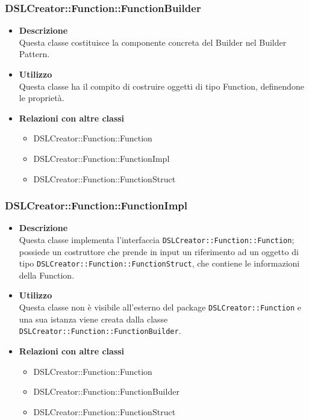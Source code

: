  \subsubsection{DSLCreator::Function::FunctionBuilder}
                    \begin{itemize}
                        \item \textbf{Descrizione} \hfill \\
                          Questa classe costituisce la componente concreta del Builder nel Builder Pattern.
                        \item \textbf{Utilizzo} \hfill \\
                          Questa classe ha il compito di costruire oggetti di tipo Function, definendone le proprietà.
                        \item \textbf{Relazioni con altre classi}
                            \begin{itemize}
                              \item DSLCreator::Function::Function
                              \item DSLCreator::Function::FunctionImpl
                              \item DSLCreator::Function::FunctionStruct
                            \end{itemize}
                    \end{itemize}  

 \subsubsection{DSLCreator::Function::FunctionImpl}
                    \begin{itemize}
                        \item \textbf{Descrizione} \hfill \\
                          Questa classe implementa l'interfaccia \texttt{DSLCreator::Function::Function}; possiede un costruttore che prende in input un riferimento ad un oggetto di tipo \texttt{DSLCreator::Function::FunctionStruct}, che contiene le informazioni della Function.
                        \item \textbf{Utilizzo} \hfill \\
                          Questa classe non è visibile all'esterno del package \texttt{DSLCreator::Function} e una sua istanza viene creata dalla classe \texttt{DSLCreator::Function::FunctionBuilder}.
                        \item \textbf{Relazioni con altre classi}
                            \begin{itemize}
                              \item DSLCreator::Function::Function
                              \item DSLCreator::Function::FunctionBuilder
                              \item DSLCreator::Function::FunctionStruct
                            \end{itemize}
                    \end{itemize}  

